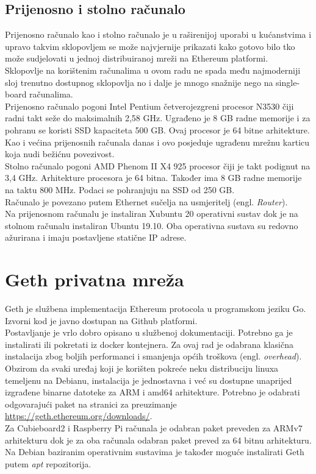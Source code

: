 \documentclass[times, utf8, zavrsni]{fer}
\begin{document}
\subsection{Prijenosno i stolno računalo}
Prijenosno računalo kao i stolno računalo je u raširenijoj uporabi u kućanstvima i upravo takvim sklopovljem se može
najvjernije prikazati kako gotovo bilo tko može sudjelovati u jednoj distribuiranoj mreži na Ethereum platformi. \\
Sklopovlje na korištenim računalima u ovom radu ne spada među najmoderniji sloj trenutno dostupnog sklopovlja no i dalje
je mnogo snažnije nego na single-board računalima. \\
Prijenosno računalo pogoni Intel Pentium četverojezgreni procesor N3530 čiji radni takt seže do maksimalnih 2,58 GHz.
Ugrađeno je 8 GB radne memorije i za pohranu se koristi SSD kapaciteta 500 GB. Ovaj procesor je 64 bitne arhitekture.
Kao i većina prijenosnih računala danas i ovo posjeduje ugrađenu mrežnu karticu koja nudi bežićnu povezivost. \\
Stolno računalo pogoni AMD Phenom II X4 925 procesor čiji je takt podignut na 3,4 GHz. Arhitekture procesora je 64 bitna.
Također ima 8 GB radne memorije na taktu 800 MHz. Podaci se pohranjuju na SSD od 250 GB. \\
Računalo je povezano putem Ethernet sučelja na usmjeritelj (engl. \emph{Router}). \\
Na prijenosnom računalu je instaliran Xubuntu 20 operativni sustav dok je na stolnom računalu instaliran Ubuntu 19.10.
Oba operativna sustava su redovno ažurirana i imaju postavljene statične IP adrese.
\section{Geth privatna mreža}
Geth je službena implementacija Ethereum protocola u programskom jeziku Go. Izvorni kod je javno dostupan na Github platformi. \\
Postavljanje je vrlo dobro opisano u službenoj dokumentaciji. Potrebno ga je instalirati ili pokretati iz docker kontejnera. 
Za ovaj rad je odabrana klasična instalacija zbog boljih performanci i smanjenja općih troškova (engl. \emph{overhead}).
Obzirom da svaki uređaj koji je korišten pokreće neku distribuciju linuxa temeljenu na Debianu, instalacija je jednostavna
i već su dostupne unaprijed izgrađene binarne datoteke za ARM i amd64 arhitekture. Potrebno je odabrati odgovarajući paket na
stranici za preuzimanje \url{https://geth.ethereum.org/downloads/}.\\ Za Cubieboard2 i Raspberry Pi računala je odabran paket
preveden za ARMv7 arhitekturu dok je za oba računala odabran paket preved za 64 bitnu arhitekturu. \\
Na Debian baziranim operativnim sustavima je također moguće instalirati Geth putem \emph{apt} repozitorija. \\
\end{document}
